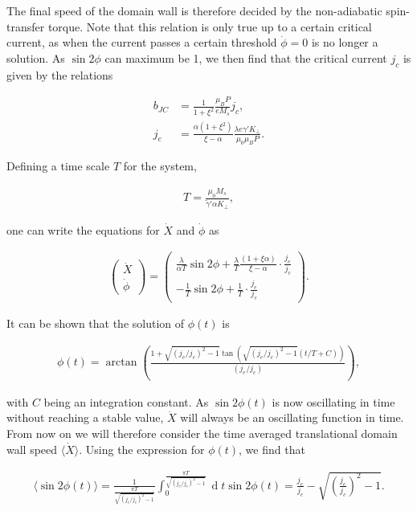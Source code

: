 \documentclass[1p]{elsarticle}		%
\renewcommand{\d}[1]{\ensuremath{\operatorname{d}\!{#1}}}
\numberwithin{equation}{section}
\begin{document}
The final speed of the domain wall is therefore decided by the non-adiabatic spin-transfer torque. Note that this relation is only true up to a certain critical current, as when the current passes a certain threshold $\dot{\phi} = 0$ is no longer a solution. As $\sin2\phi$ can maximum be 1, we then find that the critical current $j_c$ is given by the relations

\begin{align}
b_{JC} &= \frac{1}{1+\xi^2}\frac{\mu_B P}{e M_s} j_c, \\
j_c &= \frac{\alpha(1+\xi^2)}{\xi-\alpha}\frac{\lambda e \gamma ' K_{\perp}}{\mu_0\mu_B P}. \label{eq:critical_current}
\end{align}

Defining a time scale $T$ for the system,

\begin{align}
T = \frac{\mu_0 M_s}{\tilde{\gamma}' \alpha K_{\perp}},
\end{align}

one can write the equations for $\dot{X}$ and $\dot{\phi}$ as

\begin{align}
\label{eq:xdot_phidot_v2}
\begin{pmatrix}
\dot{X} \\ \dot{\phi}
\end{pmatrix}
=
\begin{pmatrix}
\frac{\lambda}{\alpha T} \sin2\phi + \frac{\lambda}{T}\frac{(1+\xi\alpha)}{\xi - \alpha} \cdot \frac{j_e}{j_c} \\
-\frac{1}{T}  \sin2\phi + \frac{1}{T}\cdot\frac{j_e}{j_c}
\end{pmatrix}.
\end{align}

It can be shown that the solution of $\phi(t)$ is

\begin{align}
\phi(t) = \arctan(\frac{1+\sqrt{(j_e/j_c)^2-1}\tan(\sqrt{(j_e/j_c)^2-1}(t/T+C))}{(j_e/j_c)}),
\end{align}

with $C$ being an integration constant. As $\sin2\phi(t)$ is now oscillating in time without reaching a stable value, $\dot{X}$ will always be an oscillating function in time. From now on we will therefore consider the time averaged translational domain wall speed $\langle \dot{X} \rangle$. Using the expression for $\phi(t)$, we find that

\begin{align}
\langle\sin2\phi(t)\rangle = \frac{1}{\frac{\pi T}{\sqrt{(j_e/j_c)^2-1}}} \int_0^{\frac{\pi T}{\sqrt{(j_e/j_c)^2-1}}} \d t \sin2\phi(t) = \frac{j_e}{j_c}-\sqrt{(\frac{j_e}{j_c})^2-1}.
\end{align}
\end{document}
